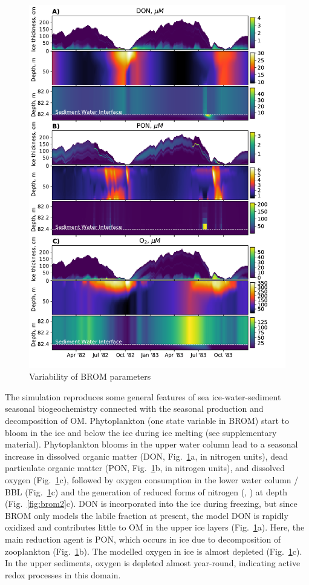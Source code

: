 \documentclass[gmd, manuscript]{copernicus}
\begin{document}
\begin{figure}[htbp]
\includegraphics[width=13.6cm]{fig05_1}
\caption{Variability of \textrm{BROM} parameters}
\label{fig:brom1}
\end{figure}

The simulation reproduces some general features of sea ice-water-sediment seasonal biogeochemistry connected with the seasonal production and decomposition of \textrm{OM}.
Phytoplankton (one state variable in \textrm{BROM}) start to bloom in the ice and below the ice during ice melting (see supplementary material).
Phytoplankton blooms in the upper water column lead to a seasonal increase in dissolved organic matter (\textrm{DON}, Fig.~\ref{fig:brom1}a, in nitrogen units), dead particulate organic matter (\textrm{PON}, Fig.~\ref{fig:brom1}b, in nitrogen units), and dissolved oxygen (Fig.~\ref{fig:brom1}c), followed by oxygen consumption in the lower water column / \textrm{BBL} (Fig.~\ref{fig:brom1}c) and the generation of reduced forms of nitrogen (, ) at depth (Fig.~\ref{fig:brom2}c).
\textrm{DON} is incorporated into the ice during freezing, but since \textrm{BROM} only models the labile fraction at present, the model \textrm{DON} is rapidly oxidized and contributes little to \textrm{OM} in the upper ice layers (Fig.~\ref{fig:brom1}a).
Here, the main reduction agent is \textrm{PON}, which occurs in ice due to decomposition of zooplankton (Fig.~\ref{fig:brom1}b).
The modelled oxygen in ice is almost depleted (Fig.~\ref{fig:brom1}c).
In the upper sediments, oxygen is depleted almost year-round, indicating active redox processes in this domain.
\end{document}

